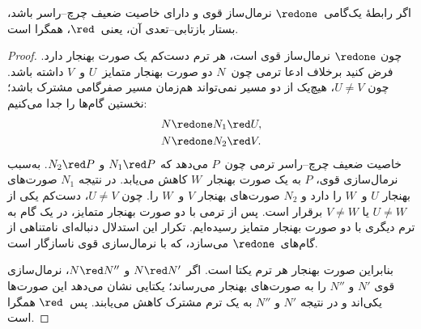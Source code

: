 \documentclass[../../../include/open-logic-section]{subfiles}
\begin{document}
\begin{lem}[لم نیومن]
اگر رابطهٔ یک‌گامی~$\redone$ نرمال‌ساز قوی و دارای خاصیت ضعیف
چرچ--راسر باشد، بستار بازتابی--تعدی آن، یعنی~$\red$، همگرا است.
\end{lem}

\begin{proof}
  چون $\redone$ نرمال‌ساز قوی است، هر ترم دست‌کم یک صورت بهنجار دارد.
  فرض کنید برخلاف ادعا ترمی چون~$N$ دو صورت بهنجار متمایز~$U$ و~$V$
  داشته باشد. چون $U\neq V$، هیچ‌یک از دو مسیر نمی‌تواند هم‌زمان مسیر
  صفرگامی مشترک باشد؛ نخستین گام‌ها را جدا می‌کنیم:
  \begin{align*}
  N &\redone N_1 \red U,\\
  N &\redone N_2 \red V.
  \end{align*}
  خاصیت ضعیف چرچ--راسر ترمی چون~$P$ می‌دهد که
  $N_1 \red P$ و $N_2 \red P$. به‌سبب نرمال‌سازی قوی، $P$ به یک
  صورت بهنجار~$W$ کاهش می‌یابد. در نتیجه $N_1$ صورت‌های بهنجار
  $U$ و~$W$ را دارد و $N_2$ صورت‌های بهنجار $V$ و~$W$ را. چون
  $U\neq V$، دست‌کم یکی از $U\neq W$ یا $V\neq W$ برقرار است. پس از
  ترمی با دو صورت بهنجار متمایز، در یک گام به ترم دیگری با دو صورت
  بهنجار متمایز رسیده‌ایم. تکرار این استدلال دنباله‌ای نامتناهی از
  گام‌های~$\redone$ می‌سازد، که با نرمال‌سازی قوی ناسازگار است.

  بنابراین صورت بهنجار هر ترم یکتا است. اگر
  $N \red N'$ و $N \red N''$، نرمال‌سازی قوی $N'$ و $N''$ را به
  صورت‌های بهنجار می‌رساند؛ یکتایی نشان می‌دهد این صورت‌ها یکی‌اند و
  در نتیجه $N'$ و $N''$ به یک ترم مشترک کاهش می‌یابند. پس~$\red$
  همگرا است.
\end{proof}
\end{document}
